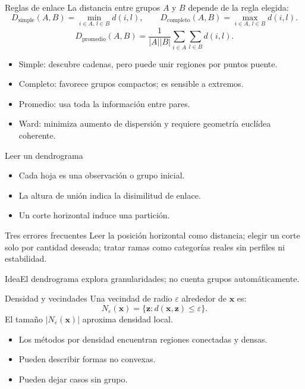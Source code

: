\documentclass[aspectratio=169,10pt]{beamer}
\begin{document}
\begin{frame}{Reglas de enlace}
  \small
  La distancia entre grupos $A$ y $B$ depende de la regla elegida:
  \[D_{\text{simple}}(A,B)=\min_{i\in A,\,l\in B}d(i,l),\qquad D_{\text{completo}}(A,B)=\max_{i\in A,\,l\in B}d(i,l).\]
  \[D_{\text{promedio}}(A,B)=\frac{1}{|A||B|}\sum_{i\in A}\sum_{l\in B}d(i,l).\]
  \begin{itemize}
    \item Simple: descubre cadenas, pero puede unir regiones por puntos puente.
    \item Completo: favorece grupos compactos; es sensible a extremos.
    \item Promedio: usa toda la información entre pares.
    \item Ward: minimiza aumento de dispersión y requiere geometría euclídea coherente.
  \end{itemize}
\end{frame}

\begin{frame}{Leer un dendrograma}
  \small
  \begin{itemize}
    \item Cada hoja es una observación o grupo inicial.
    \item La altura de unión indica la disimilitud de enlace.
    \item Un corte horizontal induce una partición.
  \end{itemize}
  \begin{alertblock}{Tres errores frecuentes}
  Leer la posición horizontal como distancia; elegir un corte solo por cantidad deseada; tratar ramas como categorías reales sin perfiles ni estabilidad.
  \end{alertblock}
  \begin{block}{Idea}El dendrograma explora granularidades; no cuenta grupos automáticamente.\end{block}
\end{frame}

\begin{frame}{Densidad y vecindades}
  \small
  Una vecindad de radio $\varepsilon$ alrededor de $\mathbf{x}$ es:
  \[N_{\varepsilon}(\mathbf{x})=\{\mathbf{z}:d(\mathbf{x},\mathbf{z})\leq\varepsilon\}.\]
  El tamaño $|N_{\varepsilon}(\mathbf{x})|$ aproxima densidad local.
  \begin{itemize}
    \item Los métodos por densidad encuentran regiones conectadas y densas.
    \item Pueden describir formas no convexas.
    \item Pueden dejar casos sin grupo.
  \end{itemize}
\end{frame}
\end{document}
